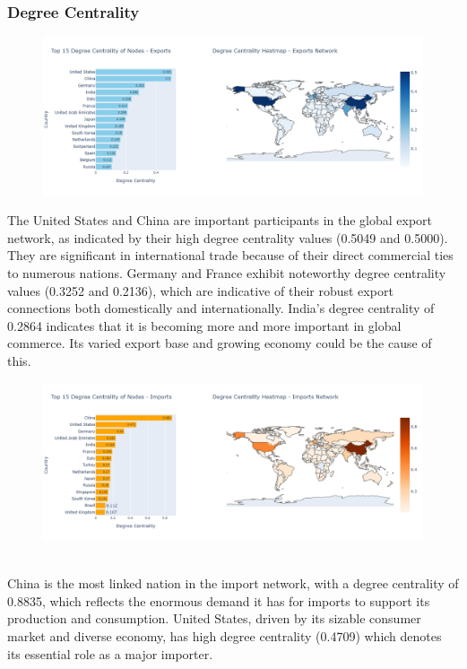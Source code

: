 \documentclass[12pt, a4paper]{article}
\begin{document}
\subsubsection{Degree Centrality}
\begin{figure}[ht]
\centering
\includegraphics[width=\textwidth]{img/exportdegree.png}
\label{fig:exportdegree}
\end{figure}
The United States and China are important participants in the global export network, as indicated by their high degree centrality values (0.5049 and 0.5000). They are significant in international trade because of their direct commercial ties to numerous nations. Germany and France exhibit noteworthy degree centrality values (0.3252 and 0.2136), which are indicative of their robust export connections both domestically and internationally.
India's degree centrality of 0.2864 indicates that it is becoming more and more important in global commerce. Its varied export base and growing economy could be the cause of this.
\begin{figure}[ht]
\centering
\includegraphics[width=\textwidth]{img/importdegree.png}
\label{fig:importdegree}
\end{figure}
\\China is the most linked nation in the import network, with a degree centrality of 0.8835, which reflects the enormous demand it has for imports to support its production and consumption.
United States, driven by its sizable consumer market and diverse economy, has high degree centrality (0.4709) which denotes its essential role as a major importer.
\end{document}
